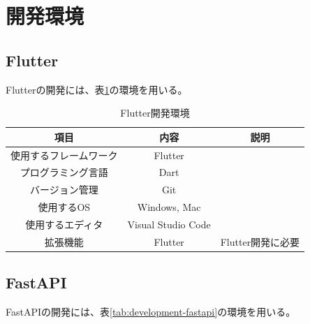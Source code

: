 \section{開発環境}
\subsection{Flutter}
Flutterの開発には、表\ref{tab:development-flutter}の環境を用いる。
\begin{table}[H]
  \centering
  \caption{Flutter開発環境}
  \label{tab:development-flutter}
  \begin{tabular}{|c|c|c|}
    \hline
    \rowcolor[HTML]{C0C0C0}
    項目          & 内容                 & 説明           \\ \hline
    使用するフレームワーク & Flutter            &              \\ \hline
    プログラミング言語   & Dart               &              \\ \hline
    バージョン管理     & Git                &              \\ \hline
    使用するOS      & Windows, Mac       &              \\ \hline
    使用するエディタ    & Visual Studio Code &              \\ \hline
    拡張機能        & Flutter            & Flutter開発に必要 \\ \hline
  \end{tabular}
\end{table}

\subsection{FastAPI}
FastAPIの開発には、表\ref{tab:development-fastapi}の環境を用いる。


